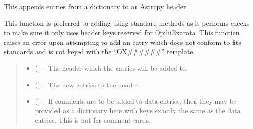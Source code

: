 \documentclass[letterpaper,11pt,english]{sphinxmanual}
\begin{document}
\begin{savenotes}\begin{fulllineitems}
\label{\detokenize{code/opihiexarata.library.fits:opihiexarata.library.fits.update_fits_header}}
\pysigstartsignatures
{}
\pysigstopsignatures
\sphinxAtStartPar
This appends entries from a dictionary to an Astropy header.

\sphinxAtStartPar
This function is preferred to adding using standard methods as it performs
checks to make sure it only uses header keys reserved for OpihiExarata.
This function raises an error upon attempting to add an entry which does
not conform to fits standards and is not keyed with the “OX\#\#\#\#\#\#”
template.
\begin{quote}\begin{description}
\begin{itemize}
\item {} 
\sphinxAtStartPar
{} () – The header which the entries will be added to.

\item {} 
\sphinxAtStartPar
{} () – The new entries to the header.

\item {} 
\sphinxAtStartPar
{} (\sphinxstyleliteralemphasis{\sphinxupquote{, }}) – If comments are to be added to data entries, then they may be
provided as a dictionary here with keys exactly the same as the
data entries. This is not for comment cards.

\end{itemize}

\end{description}\end{quote}

\end{fulllineitems}\end{savenotes}
\end{document}
